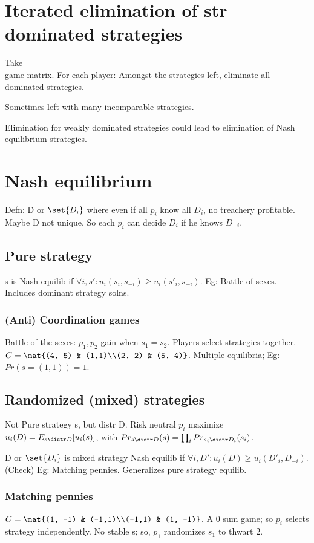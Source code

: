 \documentclass[oneside, article]{memoir}
\begin{document}
\section{Iterated elimination of str dominated strategies}
Take\\ game matrix. For each player: Amongst the strategies left, eliminate all dominated strategies.

Sometimes left with many incomparable strategies.

Elimination for weakly dominated strategies could lead to elimination of Nash equilibrium strategies.

\section{Nash equilibrium}

Defn: D or $\set{D_{i}}$ where even if all $p_{i}$ know all $D_{i}$, no treachery profitable. Maybe D not unique. So each $p_{i}$ can decide $D_{i}$ if he knows $D_{-i}$.

\subsection{Pure strategy}
s is Nash equilib if $\forall i, s': u_{i}(s_{i}, s_{-i}) \geq u_{i}(s'_{i}, s_{-i}) $. Eg: Battle of sexes. Includes dominant strategy solns.

\subsubsection{(Anti) Coordination games}
Battle of the sexes: $p_{1}, p_{2}$ gain when $s_{1} = s_{2}$. Players select strategies together. $C = \mat{(4, 5) & (1,1)\\(2, 2) & (5, 4)}$. Multiple equilibria; Eg: $Pr(s = (1,1)) = 1$.

\subsection{Randomized (mixed) strategies}
Not Pure strategy s, but distr D. Risk neutral $p_{i}$ maximize $u_{i}(D) = E_{s \distr D}[u_{i}(s)]$, with $Pr_{s \distr D}(s) = \prod_{i} Pr_{s_{i} \distr D_{i}}(s_{i})$.

D or $\set{D_{i}}$ is mixed strategy Nash equilib if $\forall i, D': u_{i}(D) \geq u_{i}(D'_{i}, D_{-i})$. (Check) Eg: Matching pennies. Generalizes pure strategy equilib.

\subsubsection{Matching pennies} $C = \mat{(1, -1) & (-1,1)\\(-1,1) & (1, -1)}$. A 0 sum game; so $p_{i}$ selects strategy independently. No stable s; so, $p_{1}$ randomizes $s_{1}$ to thwart 2.
\end{document}
